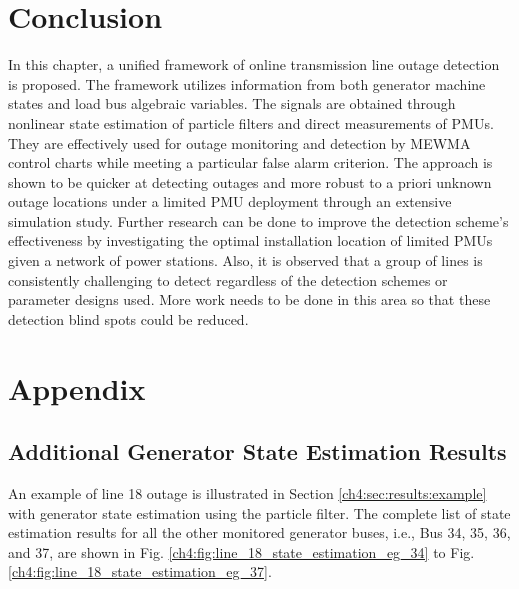 \section{Conclusion}
\label{ch4:sec:conclusion}
In this chapter, a unified framework of online transmission line outage detection is proposed. The framework utilizes information from both generator machine states and load bus algebraic variables. The signals are obtained through nonlinear state estimation of particle filters and direct measurements of PMUs. They are effectively used for outage monitoring and detection by MEWMA control charts while meeting a particular false alarm criterion. The approach is shown to be quicker at detecting outages and more robust to a priori unknown outage locations under a limited PMU deployment through an extensive simulation study. Further research can be done to improve the detection scheme’s effectiveness by investigating the optimal installation location of limited PMUs given a network of power stations. Also, it is observed that a group of lines is consistently challenging to detect regardless of the detection schemes or parameter designs used. More work needs to be done in this area so that these detection blind spots could be reduced.








\newpage
\section{Appendix} %
\label{ch4:sec:appendix}
\subsection{Additional Generator State Estimation Results}
\label{ch4:sec:appendix:state_estimation}

An example of line 18 outage is illustrated in Section \ref{ch4:sec:results:example} with generator state estimation using the particle filter. The complete list of state estimation results for all the other monitored generator buses, i.e., Bus 34, 35, 36, and 37, are shown in Fig. \ref{ch4:fig:line_18_state_estimation_eg_34} to Fig. \ref{ch4:fig:line_18_state_estimation_eg_37}.

